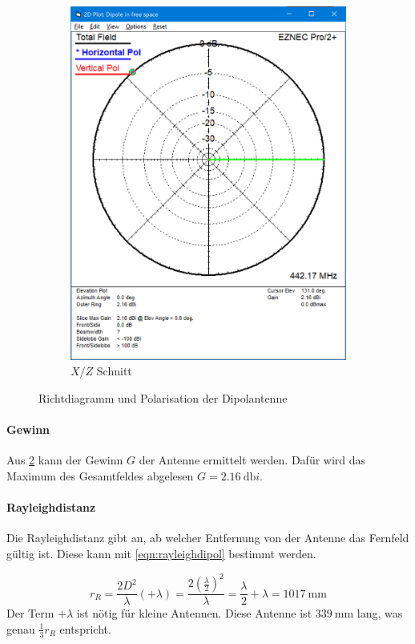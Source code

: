 \documentclass[colorlinks = true, allcolors = black, ngerman, 11pt,
a4paper, twoside, titlepage]{article}
\numberwithin{figure}{section}
\renewcommand{\si}[2]{\SI{#1}{#2}}
\begin{document}
\begin{figure}[h]
\begin{subfigure}{0.5\textwidth}
			\includegraphics[height=1.2\textwidth]{imgs/elev_richtchar_dipol.png}
			\caption{$X/Z$ Schnitt}
			\label{fig:elevdipol}
		\end{subfigure}
		\caption{Richtdiagramm und Polarisation der Dipolantenne}
		\label{figs:richtcharakteristikdipol}
	\end{figure}
	
	\paragraph{Gewinn}
	Aus \cref{figs:richtcharakteristikdipol} kann der Gewinn $G$ der Antenne ermittelt werden. Dafür wird das Maximum des Gesamtfeldes abgelesen $G=\si{2.16}{\decibel i}$.
	
	\paragraph{Rayleighdistanz}
	Die Rayleighdistanz gibt an, ab welcher Entfernung von der Antenne das Fernfeld gültig ist. Diese kann mit \cref{eqn:rayleighdipol} bestimmt werden.
	
	\begin{equation} \label{eqn:rayleighdipol}
		r_{R}=\frac{2D^{2}}{\lambda}(+\lambda) = \frac{2 \left(\frac{\lambda}{2}\right)^2}{\lambda} = \frac{\lambda}{2} + \lambda = \si{1017}{\milli\meter}
	\end{equation}
	Der Term $+\lambda$ ist nötig für kleine Antennen. Diese Antenne ist $\si{339}{\milli\meter}$ lang, was genau $\frac13 r_{R}$ entspricht.
	
\end{document}
